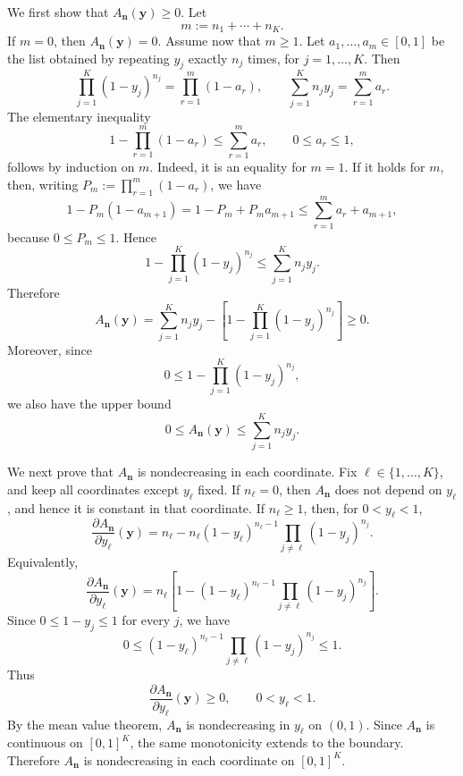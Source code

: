 \documentclass[reqno,final,11pt]{amsart}
\newcommand{\1}{\mathbbm{1}}
\theoremstyle{plain}
\theoremstyle{definition}
\theoremstyle{remark}
\begin{document}
We first show that \(A_{\mathbf n}(\mathbf y)\ge0\). Let
\[
m:=n_1+\cdots+n_K.
\]
If \(m=0\), then \(A_{\mathbf n}(\mathbf y)=0\). Assume now that \(m\ge1\). Let
\(a_1,\dots,a_m\in[0,1]\) be the list obtained by repeating \(y_j\) exactly
\(n_j\) times, for \(j=1,\dots,K\). Then
\[
\prod_{j=1}^K(1-y_j)^{n_j}
=
\prod_{r=1}^m(1-a_r),
\qquad
\sum_{j=1}^K n_jy_j
=
\sum_{r=1}^m a_r.
\]
The elementary inequality
\[
1-\prod_{r=1}^m(1-a_r)\le \sum_{r=1}^m a_r,
\qquad 0\le a_r\le1,
\]
follows by induction on \(m\). Indeed, it is an equality for \(m=1\). If it
holds for \(m\), then, writing \(P_m:=\prod_{r=1}^m(1-a_r)\), we have
\[
1-P_m(1-a_{m+1})
=
1-P_m+P_m a_{m+1}
\le
\sum_{r=1}^m a_r+a_{m+1},
\]
because \(0\le P_m\le1\). Hence
\[
1-\prod_{j=1}^K(1-y_j)^{n_j}
\le
\sum_{j=1}^K n_jy_j.
\]
Therefore
\[
A_{\mathbf n}(\mathbf y)
=
\sum_{j=1}^K n_jy_j
-
\left[
1-\prod_{j=1}^K(1-y_j)^{n_j}
\right]
\ge0.
\]
Moreover, since
\[
0\le 1-\prod_{j=1}^K(1-y_j)^{n_j},
\]
we also have the upper bound
\[
0\le A_{\mathbf n}(\mathbf y)\le \sum_{j=1}^K n_jy_j.
\]

We next prove that \(A_{\mathbf n}\) is nondecreasing in each coordinate. Fix
\(\ell\in\{1,\dots,K\}\), and keep all coordinates except \(y_\ell\) fixed. If
\(n_\ell=0\), then \(A_{\mathbf n}\) does not depend on \(y_\ell\), and hence it is
constant in that coordinate. If \(n_\ell\ge1\), then, for \(0<y_\ell<1\),
\[
\frac{\partial A_{\mathbf n}}{\partial y_\ell}(\mathbf y)
=
n_\ell
-
n_\ell(1-y_\ell)^{n_\ell-1}
\prod_{j\ne\ell}(1-y_j)^{n_j}.
\]
Equivalently,
\[
\frac{\partial A_{\mathbf n}}{\partial y_\ell}(\mathbf y)
=
n_\ell
\left[
1-(1-y_\ell)^{n_\ell-1}
\prod_{j\ne\ell}(1-y_j)^{n_j}
\right].
\]
Since \(0\le 1-y_j\le1\) for every \(j\), we have
\[
0\le
(1-y_\ell)^{n_\ell-1}
\prod_{j\ne\ell}(1-y_j)^{n_j}
\le1.
\]
Thus
\[
\frac{\partial A_{\mathbf n}}{\partial y_\ell}(\mathbf y)\ge0,
\qquad 0<y_\ell<1.
\]
By the mean value theorem, \(A_{\mathbf n}\) is nondecreasing in \(y_\ell\) on
\((0,1)\). Since \(A_{\mathbf n}\) is continuous on \([0,1]^K\), the same
monotonicity extends to the boundary. Therefore \(A_{\mathbf n}\) is
nondecreasing in each coordinate on \([0,1]^K\).
\end{document}
